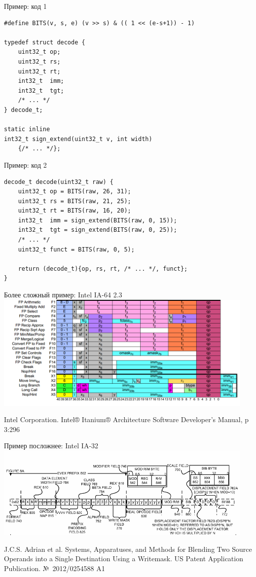 \documentclass{beamer}
\begin{document}
\begin{frame}[fragile]{Пример: код 1}
\begin{verbatim}
#define BITS(v, s, e) (v >> s) & (( 1 << (e-s+1)) - 1)

typedef struct decode {
    uint32_t op;
    uint32_t rs;
    uint32_t rt;
    int32_t  imm;
    int32_t  tgt;
    /* ... */
} decode_t;

static inline
int32_t sign_extend(uint32_t v, int width) 
    {/* ... */};
\end{verbatim}
\end{frame}

\begin{frame}[fragile]{Пример: код 2}
\begin{verbatim}
decode_t decode(uint32_t raw) {
    uint32_t op = BITS(raw, 26, 31);
    uint32_t rs = BITS(raw, 21, 25);
    uint32_t rt = BITS(raw, 16, 20);
    int32_t  imm = sign_extend(BITS(raw, 0, 15));
    int32_t  tgt = sign_extend(BITS(raw, 0, 25));
    /* ... */
    uint32_t funct = BITS(raw, 0, 5);

    return (decode_t){op, rs, rt, /* ... */, funct};
}
\end{verbatim}
\end{frame}

\begin{frame}{Более сложный пример: Intel IA-64 2.3}
\centering
\includegraphics[width=0.95\textwidth]{./ia64-formats}

\tiny{Intel Corporation. Intel® Itanium® Architecture Software Developer’s Manual, p 3:296}

\end{frame}

\begin{frame}{Пример посложнее: Intel IA-32}
\centering
\includegraphics[width=0.95\textwidth]{./ia-32-evex}

\tiny{J.C.S. Adrian et al. Systems, Apparatuses, and Methods for Blending Two Source Operands into a Single Destination Using a Writemask. US Patent Application Publication. №~2012/0254588 A1}

\end{frame}
\end{document}
